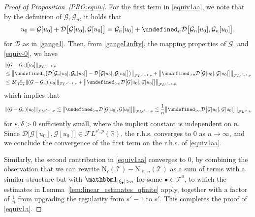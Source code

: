 \documentclass[a4paper,
11pt,  reqno]{amsart}
\newcommand{\5}{\textup{V}}
\newcommand{\FL}{\mathcal{F} L}
\newcommand{\ind}{\mathbbm 1}
\newcommand{\les}{\lesssim}
\newcommand{\dl}{\delta}
\newcommand{\eps}{\varepsilon}
\theoremstyle{remark}
\newcommand{\R}{\mathbb{R}}
\newcommand{\bul}{\bullet}
\let\P= \undefined
\newcommand{\P}{\mathbf{P}}
\newcommand{\TT}{\mathcal{T}}
\renewcommand{\l}{\ell}
\newcommand{\Gc}{\mathcal{G}}
\numberwithin{equation}{section}
\numberwithin{theorem}{section}
\newcommand{\NN}{\mathrm{N}}
\newcommand{\DD}{\mathcal{D}}
\begin{document}
\begin{proof}[Proof of Proposition~\ref{PRO:equiv}]
For the first term in \eqref{equiv1aa}, we note that by the definition of $\Gc, \Gc_n$, it holds that
\begin{align}
u_0
=
\Gc[u_0] + \DD\big[\Gc[u_0], \Gc[u_0]\big]
=
\Gc_n[u_0] + \P_n \DD\big[\Gc_n[u_0], \Gc_n[u_0]\big],
\end{align}
for $\DD$ as in \eqref{gauge1}. Then, from \eqref{gaugeLinfty}, the mapping properties of $\Gc$, and \eqref{equiv-0}, we have
\begin{align}
&
\| (\Gc - \Gc_n)[u_0] \|_{\FL^{s'-1,p}}
\\
&
\le \big\| \P_n \big( \DD\big[\Gc_n[u_0], \Gc_n[u_0]\big]- \DD\big[\Gc[u_0], \Gc[u_0]\big]  \big)  \big\|_{\FL^{s'-1,p}}
+
\big\| \P_{>n} \DD\big[\Gc[u_0], \Gc[u_0]\big]  \big\|_{\FL^{s'-1,p}}
\\
&
\le 2  \dl \tfrac{\eps}{1-\eps} \| (\Gc - \Gc_n)[u_0] \|_{\FL^{s'-1,p}} +
\big\| \P_{>n} \DD\big[\Gc[u_0], \Gc[u_0]\big]  \big\|_{\FL^{s'-1,p}}
\end{align}
which implies that
\begin{align}
\| (\Gc - \Gc_n)[u_0] \|_{\FL^{s'-1,p}}
\les \big\| \P_{>n} \DD\big[\Gc[u_0], \Gc[u_0]\big]  \big\|_{\FL^{s'-1,p}}\lesssim \frac{1}{n}\big\| \P_{>n} \DD\big[\Gc[u_0], \Gc[u_0]\big]  \big\|_{\FL^{s',p}}
\end{align}
for $\eps,\dl>0$ sufficiently small, where the implicit constant is independent on $n$. Since $\DD\big[\Gc[u_0], \Gc[u_0]\big] \in \FL^{s',p}(\R)$, the r.h.s. converges to 0 as $n\to\infty$, and we conclude the convergence of the first term on the r.h.s. of \eqref{equiv1aa}.


Similarly, the second contribution in \eqref{equiv1aa} converges to 0, by combining the observation that we can rewrite $\NN_{\l}(\TT) - \NN_{\l, n}(\TT)$ as a sum of terms with a similar structure but with $\ind_{|\xi_{\bul}| > n}$ for some $\bul \in \TT^0$, to which the estimates in Lemma~\ref{lem:linear_estimates_qfinite} apply, together with a factor of $\frac1n$ from upgrading the regularity from $s'-1$ to $s'$.
This completes the proof of \eqref{equiv1a}.

\smallskip


\end{proof}
\end{document}
